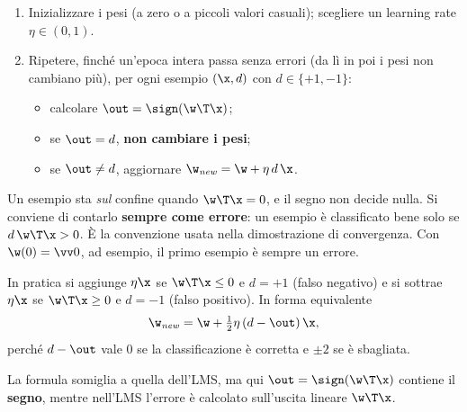 \begin{algoritmo}
\begin{enumerate}
  \item Inizializzare i pesi (a zero o a piccoli valori casuali); scegliere un learning rate $\eta\in(0,1)$.
  \item Ripetere, finché un'epoca intera passa senza errori (da lì in poi i pesi non cambiano più), per ogni
        esempio $(\x,d)$ con $d\in\{+1,-1\}$:
        \begin{itemize}
          \item calcolare $\out = \sign(\w\T\x)$;
          \item se $\out = d$, \textbf{non cambiare i pesi};
          \item se $\out\neq d$, aggiornare $\w_{\mathit{new}} = \w + \eta\,d\,\x$.
        \end{itemize}
\end{enumerate}
\end{algoritmo}

\begin{attenzione}[Il caso $\w\T\x = 0$]
Un esempio sta \emph{sul} confine quando $\w\T\x = 0$, e il segno non decide nulla. Si conviene di contarlo
\textbf{sempre come errore}: un esempio è classificato bene solo se $d\,\w\T\x > 0$. È la convenzione usata nella
dimostrazione di convergenza. Con $\w(0)=\vv0$, ad esempio, il primo esempio è sempre un errore.
\end{attenzione}

In pratica si aggiunge $\eta\x$ se $\w\T\x\le0$ e $d=+1$ (falso negativo) e si sottrae $\eta\x$ se $\w\T\x\ge0$ e
$d=-1$ (falso positivo). In forma equivalente
\[
\w_{\mathit{new}} = \w + \tfrac12\eta\,(d-\out)\,\x ,
\]
perché $d-\out$ vale 0 se la classificazione è corretta e $\pm2$ se è sbagliata.

\begin{attenzione}
La formula somiglia a quella dell'LMS, ma qui $\out = \sign(\w\T\x)$ contiene il \textbf{segno}, mentre nell'LMS
l'errore è calcolato sull'uscita lineare $\w\T\x$.
\end{attenzione}

